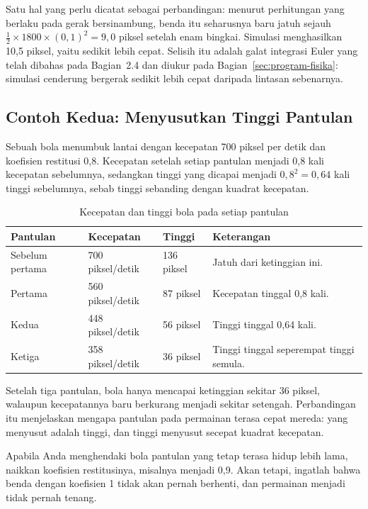 Satu hal yang perlu dicatat sebagai perbandingan: menurut perhitungan yang
berlaku pada gerak bersinambung, benda itu seharusnya baru jatuh sejauh
$\frac{1}{2} \times 1800 \times (0{,}1)^2 = 9{,}0$ piksel setelah enam bingkai.
Simulasi menghasilkan 10,5 piksel, yaitu sedikit lebih cepat. Selisih itu
adalah galat integrasi Euler yang telah dibahas pada Bagian~2.4 dan diukur
pada Bagian~\ref{sec:program-fisika}: simulasi cenderung bergerak sedikit lebih
cepat daripada lintasan sebenarnya.

\subsection{Contoh Kedua: Menyusutkan Tinggi Pantulan}

\begin{contohbox}
Sebuah bola menumbuk lantai dengan kecepatan 700 piksel per detik dan
koefisien restitusi 0,8. Kecepatan setelah setiap pantulan menjadi 0,8 kali
kecepatan sebelumnya, sedangkan tinggi yang dicapai menjadi
$0{,}8^2 = 0{,}64$ kali tinggi sebelumnya, sebab tinggi sebanding dengan
kuadrat kecepatan.
\end{contohbox}

\begin{table}[htbp]
\centering
\caption{Kecepatan dan tinggi bola pada setiap pantulan}
\label{tab:pantulan-bertahap}
{\setlength{\tabcolsep}{4pt}\footnotesize%
\begin{tabularx}{\textwidth}{@{}C{2.2cm} C{3.0cm} C{2.8cm} Y@{}}
\toprule
\headrow \textbf{Pantulan} & \textbf{Kecepatan} & \textbf{Tinggi} & \textbf{Keterangan} \\
\midrule
Sebelum pertama & 700 piksel/detik & 136 piksel & Jatuh dari ketinggian ini. \\
\addlinespace
Pertama & 560 piksel/detik & 87 piksel & Kecepatan tinggal 0,8 kali. \\
\addlinespace
Kedua & 448 piksel/detik & 56 piksel & Tinggi tinggal 0,64 kali. \\
\addlinespace
Ketiga & 358 piksel/detik & 36 piksel & Tinggi tinggal seperempat tinggi semula. \\
\bottomrule
\end{tabularx}}
\end{table}

Setelah tiga pantulan, bola hanya mencapai ketinggian sekitar 36 piksel,
walaupun kecepatannya baru berkurang menjadi sekitar setengah. Perbandingan
itu menjelaskan mengapa pantulan pada permainan terasa cepat mereda: yang
menyusut adalah tinggi, dan tinggi menyusut secepat kuadrat kecepatan.

Apabila Anda menghendaki bola pantulan yang tetap terasa hidup lebih lama,
naikkan koefisien restitusinya, misalnya menjadi 0,9. Akan tetapi, ingatlah
bahwa benda dengan koefisien 1 tidak akan pernah berhenti, dan permainan
menjadi tidak pernah tenang.
